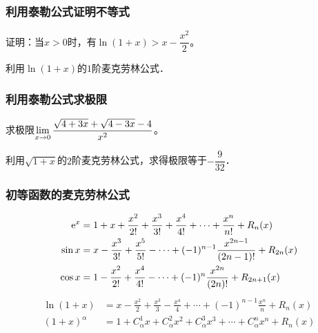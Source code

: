 \documentclass[14pt,notheorems,leqno,xcolor={rgb}]{beamer} %
\begin{document}
\begin{frame}\label{maclaurin:log}
\frametitle{利用泰勒公式证明不等式}
\begin{example}
证明：当$x>0$时，有$\ln(1+x)>x-\dfrac{x^2}{2}$。
\end{example}
\pause
\begin{solution}
利用$\ln(1+x)$的$1$阶麦克劳林公式．\hfill
\hyperlink{maclaurin<4>}{}
\end{solution}
\end{frame}


\begin{frame}\label{maclaurin:sqrt}
\frametitle{利用泰勒公式求极限}
\begin{example}
求极限$\lim\limits_{x\to0}\dfrac{\sqrt{4+3x}+\sqrt{4-3x}-4}{x^2}$。
\end{example}
\pause
\begin{solution}
利用$\sqrt{1+x}$的$2$阶麦克劳林公式，求得极限等于$-\dfrac{9}{32}$．\hfill
\hyperlink{maclaurin<5>}{}
\end{solution}
\end{frame}

\begin{frame}[shrink=10]\label{maclaurin:list}
\frametitle{初等函数的麦克劳林公式}
\noindent\begin{align*}
\mathrm{e}^x &= 1 + x + \frac{x^2}{2!} + \frac{x^3}{3!} + \frac{x^4}{4!} + \cdots + \frac{x^n}{n!} + R_n(x) \\
\sin x &= x-\frac{x^3}{3!}+\frac{x^5}{5!}-\cdots + (-1)^{n-1}\frac{x^{2n-1}}{(2n-1)!} + R_{2n}(x) \\
\cos x &= 1-\frac{x^2}{2!}+\frac{x^4}{4!}-\cdots+(-1)^n\frac{x^{2n}}{(2n)!} + R_{2n+1}(x)
\end{align*}
\vfill\bold{\cdotfill}\vfill
\noindent\begin{align*}
\ln(1+x) &= x - \frac{x^2}2 + \frac{x^3}{3} - \frac{x^4}{4} +\cdots + (-1)^{n-1}\frac{x^n}{n} + R_n(x) \\
(1+x)^{\alpha} &= 1 + C_\alpha^1x + C_\alpha^2x^2 + C_\alpha^3x^3 +\cdots + C_\alpha^n{x^n} + R_n(x)
\end{align*}
\end{frame}
\end{document}
